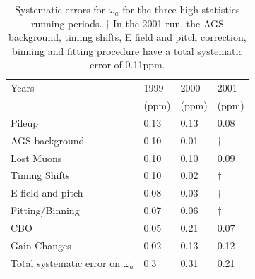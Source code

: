 \documentclass{outhesis}
\begin{document}
\begin{table}
  \caption[Systematic errors for $\omega_a$]{Systematic errors for $\omega_a$ for the three high-statistics running periods. ${\dagger}$ In the 2001 run, the AGS background, timing shifts, E field and pitch correction, binning and fitting procedure have a total systematic error of 0.11ppm. }
  \label{tab:sys}
  \centering
  \begin{tabular}{*{4}{l}}
	\hline \hline
      Years   & 1999 & 2000  & 2001 \\ 
       & (ppm) & (ppm) & (ppm)\\
      \hline
       Pileup & 0.13 & 0.13 & 0.08  \\
       AGS background & 0.10 & 0.01 &    ${\dagger}$\\
       Lost Muons & 0.10 & 0.10 & 0.09  \\
       Timing Shifts & 0.10 & 0.02 &    ${\dagger}$\\
       E-field and pitch & 0.08 & 0.03 &    ${\dagger}$\\
       Fitting/Binning & 0.07 & 0.06 &    ${\dagger}$\\
       CBO  & 0.05 & 0.21 & 0.07  \\
       Gain Changes & 0.02 & 0.13 & 0.12   \\ \hline
       Total systematic error on $\omega_a$ & 0.3 & 0.31 & 0.21  \\
         \hline  \hline
     \end{tabular}
\end{table}
\end{document}
